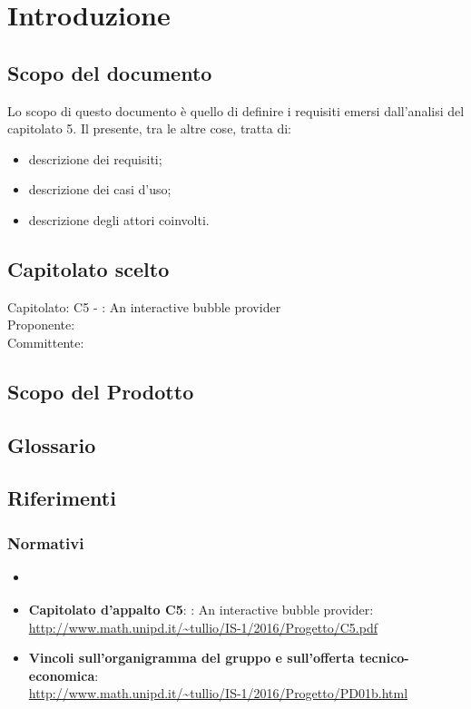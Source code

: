 \section{Introduzione}

\subsection{Scopo del documento}
Lo scopo di questo documento è quello di definire i requisiti emersi dall'analisi del capitolato 5.
Il presente, tra le altre cose, tratta di:
\begin{itemize}
	\item descrizione dei requisiti;
	\item descrizione dei casi d'uso;
	\item descrizione degli attori coinvolti.
\end{itemize}

\subsection{Capitolato scelto}
Capitolato: C5 - \ProjectName{}: An interactive bubble provider \\
Proponente: \Proponente{} \\
Committente: \Committente{} \\

\subsection{Scopo del Prodotto}
\ScopoDelProdotto

\subsection{Glossario}
\GlossarioIntroduzione

\subsection{Riferimenti}
\subsubsection{Normativi}
\begin{itemize}
	\item \textbf{\NormeDiProgetto}
	\item\textbf{Capitolato d'appalto C5}: \ProjectName{}: An interactive bubble provider:\\ \url{http://www.math.unipd.it/~tullio/IS-1/2016/Progetto/C5.pdf}
	\item \textbf{Vincoli sull'organigramma del gruppo e sull'offerta tecnico-economica}: \\ \url{http://www.math.unipd.it/~tullio/IS-1/2016/Progetto/PD01b.html}
\end{itemize}

